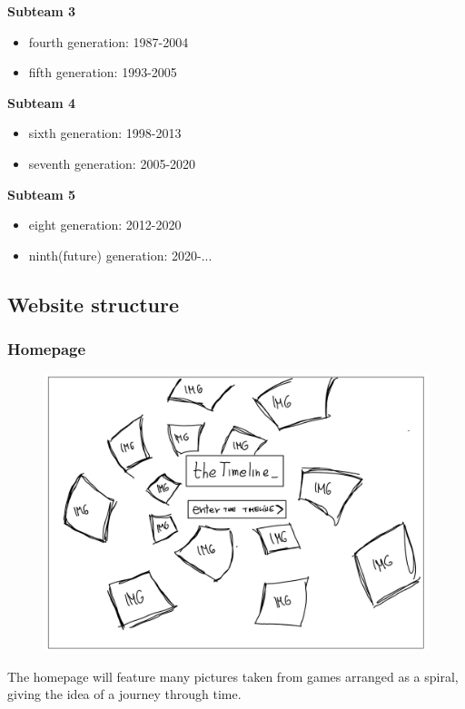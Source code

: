 \documentclass[a4paper,10pt]{article}
\begin{document}
     \textbf{Subteam 3}
     \vspace{-0.3cm}
     \begin{itemize}
     \item fourth generation: 1987-2004
     \vspace{-0.3cm}
     \item fifth generation: 1993-2005
     \end{itemize}
     
     \textbf{Subteam 4}
     \vspace{-0.3cm}
     \begin{itemize}
     \item sixth generation: 1998-2013
     \vspace{-0.3cm}
     \item seventh generation: 2005-2020
     \end{itemize}
     
     \textbf{Subteam 5}
     \vspace{-0.3cm}
     \begin{itemize}
     \item eight generation: 2012-2020
     \vspace{-0.3cm}
     \item ninth(future) generation: 2020-...
     \vspace{-0.3cm}
     \end{itemize}
    
    \subsection{Website structure}
    \subsubsection{Homepage}        
        \begin{figure}[h]
        \includegraphics[width=.5\linewidth]{media/homepage_sketch.jpg}
        \end{figure}
        The homepage will feature many pictures taken from games arranged as a spiral, giving the idea of a journey through time.
        \newline
    \newpage
\end{document}
